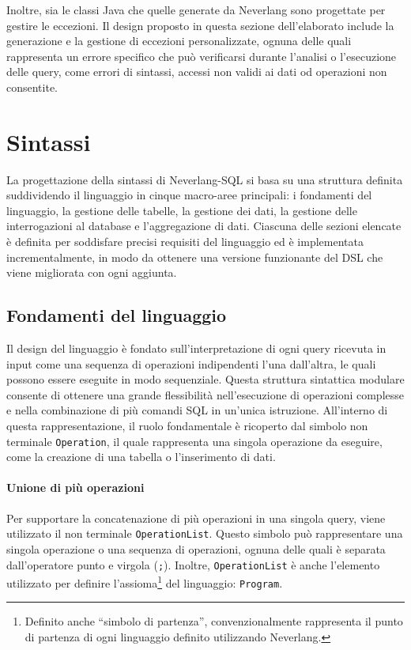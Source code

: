 \documentclass[12pt,a4paper,openright,twoside]{book}
\begin{document}
Inoltre, sia le classi Java che quelle generate da Neverlang sono progettate per gestire le eccezioni. Il design proposto in questa 
sezione dell'elaborato include la generazione e la gestione di eccezioni personalizzate, ognuna delle quali rappresenta un errore 
specifico che può verificarsi durante l’analisi o l’esecuzione delle query, come errori di sintassi, accessi non validi ai dati 
od operazioni non consentite.


\section{Sintassi}
La progettazione della sintassi di Neverlang-SQL si basa su una struttura definita suddividendo il linguaggio in cinque macro-aree 
principali: i fondamenti del linguaggio, la gestione delle tabelle, la gestione dei dati, la gestione delle interrogazioni al 
database e l'aggregazione di dati. Ciascuna delle sezioni elencate è definita per soddisfare precisi requisiti del linguaggio ed 
è implementata incrementalmente, in modo da ottenere una versione funzionante del DSL che viene migliorata con ogni aggiunta.

\subsection{Fondamenti del linguaggio}
\label{subsec:fondamenti-linguaggio}
Il design del linguaggio è fondato sull’interpretazione di ogni query ricevuta in input come una sequenza di operazioni 
indipendenti l’una dall’altra, le quali possono essere eseguite in modo sequenziale. Questa struttura sintattica modulare consente 
di ottenere una grande flessibilità nell’esecuzione di operazioni complesse e nella combinazione di più comandi SQL in un’unica 
istruzione. All'interno di questa rappresentazione, il ruolo fondamentale è ricoperto dal simbolo non terminale \texttt{Operation}, 
il quale rappresenta una singola operazione da eseguire, come la creazione di una tabella o l’inserimento di dati.

\paragraph{Unione di più operazioni}
Per supportare la concatenazione di più operazioni in una singola query, viene utilizzato il non terminale \texttt{OperationList}. 
Questo simbolo può rappresentare una singola operazione o una sequenza di operazioni, ognuna delle quali è separata dall’operatore 
punto e virgola (\texttt{;}). Inoltre, \texttt{OperationList} è anche l'elemento utilizzato per definire l'assioma\footnote{Definito 
anche ``simbolo di partenza'', convenzionalmente rappresenta il punto di partenza di ogni linguaggio definito utilizzando Neverlang.} 
del linguaggio: \texttt{Program}.
\end{document}
